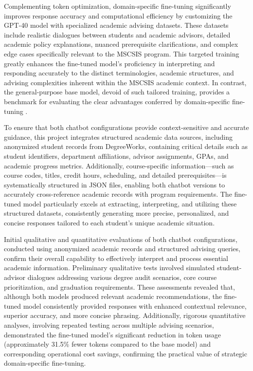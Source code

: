 \documentclass[12pt,oneside,openany]{report}
\begin{document}
Complementing token optimization, domain-specific fine-tuning significantly improves response accuracy and computational efficiency by customizing the GPT-40 model with specialized academic advising datasets. These datasets include realistic dialogues between students and academic advisors, detailed academic policy explanations, nuanced prerequisite clarifications, and complex edge cases specifically relevant to the MSCSIS program. This targeted training greatly enhances the fine-tuned model’s proficiency in interpreting and responding accurately to the distinct terminologies, academic structures, and advising complexities inherent within the MSCSIS academic context. In contrast, the general-purpose base model, devoid of such tailored training, provides a benchmark for evaluating the clear advantages conferred by domain-specific fine-tuning \cite{openai_finetuning_guide}.

To ensure that both chatbot configurations provide context-sensitive and accurate guidance, this project integrates structured academic data sources, including anonymized student records from DegreeWorks, containing critical details such as student identifiers, department affiliations, advisor assignments, GPAs, and academic progress metrics. Additionally, course-specific information—such as course codes, titles, credit hours, scheduling, and detailed prerequisites—is systematically structured in JSON files, enabling both chatbot versions to accurately cross-reference academic records with program requirements. The fine-tuned model particularly excels at extracting, interpreting, and utilizing these structured datasets, consistently generating more precise, personalized, and concise responses tailored to each student’s unique academic situation.

Initial qualitative and quantitative evaluations of both chatbot configurations, conducted using anonymized academic records and structured advising queries, confirm their overall capability to effectively interpret and process essential academic information. Preliminary qualitative tests involved simulated student-advisor dialogues addressing various degree audit scenarios, core course prioritization, and graduation requirements. These assessments revealed that, although both models produced relevant academic recommendations, the fine-tuned model consistently provided responses with enhanced contextual relevance, superior accuracy, and more concise phrasing. Additionally, rigorous quantitative analyses, involving repeated testing across multiple advising scenarios, demonstrated the fine-tuned model’s significant reduction in token usage (approximately 31.5\% fewer tokens compared to the base model) and corresponding operational cost savings, confirming the practical value of strategic domain-specific fine-tuning.
\end{document}
